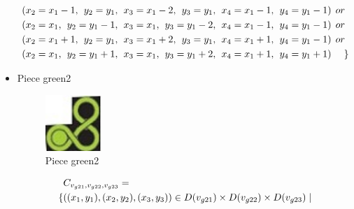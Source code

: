 \begin{appendices}
\begin{itemize}
\begin{align*}
&(x_{2} = x_{1}-1,\hspace{1ex}y_{2} = y_{1},\hspace{1ex}x_{3} = x_{1}-2, \hspace{1ex}y_{3} = y_{1},\hspace{1ex}x_{4} = x_{1}-1,\hspace{1ex}y_{4} = y_{1}-1)\hspace{1ex} or\\
&(x_{2} = x_{1},\hspace{1ex}y_{2} = y_{1}-1,\hspace{1ex}x_{3} = x_{1}, \hspace{1ex}y_{3} = y_{1}-2,\hspace{1ex}x_{4} = x_{1}-1,\hspace{1ex}y_{4} = y_{1}-1)\hspace{1ex} or\\
&(x_{2} = x_{1}+1,\hspace{1ex}y_{2} = y_{1},\hspace{1ex}x_{3} = x_{1}+2, \hspace{1ex}y_{3} = y_{1},\hspace{1ex}x_{4} = x_{1}+1,\hspace{1ex}y_{4} = y_{1}-1)\hspace{1ex} or\\
&(x_{2} = x_{1},\hspace{1ex}y_{2} = y_{1}+1,\hspace{1ex}x_{3} = x_{1}, \hspace{1ex}y_{3} = y_{1}+2,\hspace{1ex}x_{4} = x_{1}+1,\hspace{1ex}y_{4} = y_{1}+1)\hspace{3ex} \}
\end{align*}
 \item Piece green2\\
\begin{figure}[H]
    \centering
    \includegraphics[width=0.2\textwidth]{figs/green2.jpg}
    \caption{Piece green2}
\end{figure}
 \begin{align*}
&\Con{g21}{g22}{g23}=
\\\{&((x_{1},y_{1}),(x_{2},y_{2}),(x_{3},y_{3}))\in \Domain{g21}\times \Domain{g22}\times\Domain{g23}\mid\\

\end{align*}
\end{itemize}
\end{appendices}
